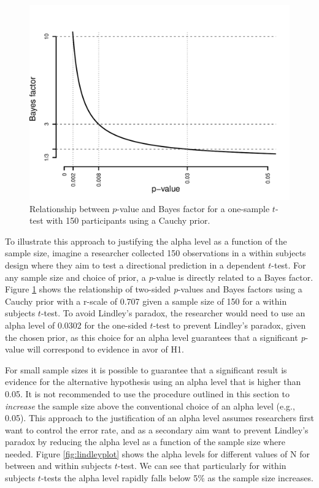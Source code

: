 \documentclass[
  english,
  ,man, a4paper,floatsintext]{apa6}
\begin{document}
\begin{figure}
\centering
\includegraphics{Justify_in_Practice_files/figure-latex/Lindley150-1.pdf}
\caption{\label{fig:Lindley150}Relationship between \(p\)-value and Bayes factor for a one-sample \(t\)-test with 150 participants using a Cauchy prior.}
\end{figure}

To illustrate this approach to justifying the alpha level as a function of the sample size, imagine a researcher collected 150 observations in a within subjects design where they aim to test a directional prediction in a dependent \(t\)-test. For any sample size and choice of prior, a \emph{p}-value is directly related to a Bayes factor. Figure \ref{fig:Lindley150} shows the relationship of two-sided \emph{p}-values and Bayes factors using a Cauchy prior with a r-scale of 0.707 given a sample size of 150 for a within subjects \(t\)-test. To avoid Lindley's paradox, the researcher would need to use an alpha level of 0.0302 for the one-sided \(t\)-test to prevent Lindley's paradox, given the chosen prior, as this choice for an alpha level guarantees that a significant \emph{p}-value will correspond to evidence in avor of H1.

For small sample sizes it is possible to guarantee that a significant result is evidence for the alternative hypothesis using an alpha level that is higher than 0.05. It is not recommended to use the procedure outlined in this section to \emph{increase} the sample size above the conventional choice of an alpha level (e.g., 0.05). This approach to the justification of an alpha level assumes researchers first want to control the error rate, and as a secondary aim want to prevent Lindley's paradox by reducing the alpha level as a function of the sample size where needed. Figure \ref{fig:lindleyplot} shows the alpha levels for different values of N for between and within subjects \(t\)-test. We can see that particularly for within subjects \(t\)-tests the alpha level rapidly falls below 5\% as the sample size increases.
\end{document}
